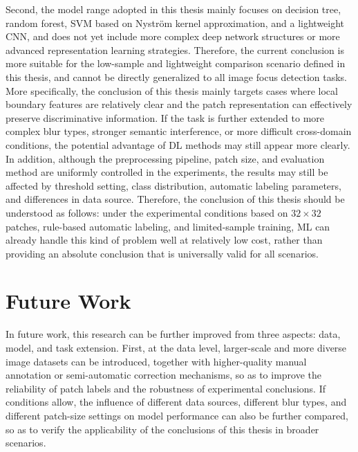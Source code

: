 \par Second, the model range adopted in this thesis mainly focuses on decision
tree, random forest, SVM based on Nystr\"{o}m kernel approximation, and a
lightweight CNN, and does not yet include more complex deep network structures
or more advanced representation learning strategies. Therefore, the current
conclusion is more suitable for the low-sample and lightweight comparison
scenario defined in this thesis, and cannot be directly generalized to all
image focus detection tasks. More specifically, the conclusion of this thesis
mainly targets cases where local boundary features are relatively clear and the
patch representation can effectively preserve discriminative information. If
the task is further extended to more complex blur types, stronger semantic
interference, or more difficult cross-domain conditions, the potential
advantage of DL methods may still appear more clearly. In addition, although
the preprocessing pipeline, patch size, and evaluation method are uniformly
controlled in the experiments, the results may still be affected by threshold
setting, class distribution, automatic labeling parameters, and differences in
data source. Therefore, the conclusion of this thesis should be understood as
follows: under the experimental conditions based on $32\times32$ patches,
rule-based automatic labeling, and limited-sample training, ML can already
handle this kind of problem well at relatively low cost, rather than providing
an absolute conclusion that is universally valid for all scenarios.

\section{Future Work}
\par In future work, this research can be further improved from three aspects:
data, model, and task extension. First, at the data level, larger-scale and
more diverse image datasets can be introduced, together with higher-quality
manual annotation or semi-automatic correction mechanisms, so as to improve
the reliability of patch labels and the robustness of experimental conclusions.
If conditions allow, the influence of different data sources, different blur
types, and different patch-size settings on model performance can also be
further compared, so as to verify the applicability of the conclusions of this
thesis in broader scenarios.

